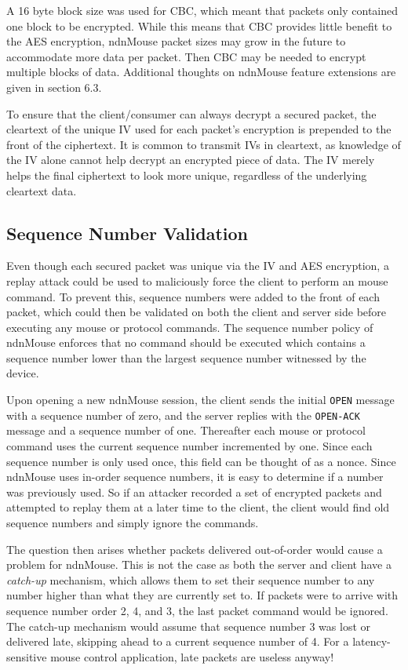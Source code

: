 \documentclass{sig-alternate}
\renewcommand\_{\textunderscore\allowbreak}  %
\begin{document}
A 16 byte block size was used for CBC, which meant that packets only contained one block to be encrypted. While this means that CBC provides little benefit to the AES encryption, ndnMouse packet sizes may grow in the future to accommodate more data per packet. Then CBC may be needed to encrypt multiple blocks of data. Additional thoughts on ndnMouse feature extensions are given in section 6.3.

To ensure that the client/consumer can always decrypt a secured packet, the cleartext of the unique IV used for each packet's encryption is prepended to the front of the ciphertext. It is common to transmit IVs in cleartext, as knowledge of the IV alone cannot help decrypt an encrypted piece of data. The IV merely helps the final ciphertext to look more unique, regardless of the underlying cleartext data.

\subsection{Sequence Number Validation}
Even though each secured packet was unique via the IV and AES encryption, a replay attack could be used to maliciously force the client to perform an mouse command. To prevent this, sequence numbers were added to the front of each packet, which could then be validated on both the client and server side before executing any mouse or protocol commands. The sequence number policy of ndnMouse enforces that no command should be executed which contains a sequence number lower than the largest sequence number witnessed by the device. 

Upon opening a new ndnMouse session, the client sends the initial \texttt{OPEN} message with a sequence number of zero, and the server replies with the \texttt{OPEN-ACK} message and a sequence number of one. Thereafter each mouse or protocol command uses the current sequence number incremented by one. Since each sequence number is only used once, this field can be thought of as a nonce. Since ndnMouse uses in-order sequence numbers, it is easy to determine if a number was previously used. So if an attacker recorded a set of encrypted packets and attempted to replay them at a later time to the client, the client would find old sequence numbers and simply ignore the commands.

The question then arises whether packets delivered out-of-order would cause a problem for ndnMouse. This is not the case as both the server and client have a \textit{catch-up} mechanism, which allows them to set their sequence number to any number higher than what they are currently set to. If packets were to arrive with sequence number order 2, 4, and 3, the last packet command would be ignored. The catch-up mechanism would assume that sequence number 3 was lost or delivered late, skipping ahead to a current sequence number of 4. For a latency-sensitive mouse control application, late packets are useless anyway!
\end{document}

